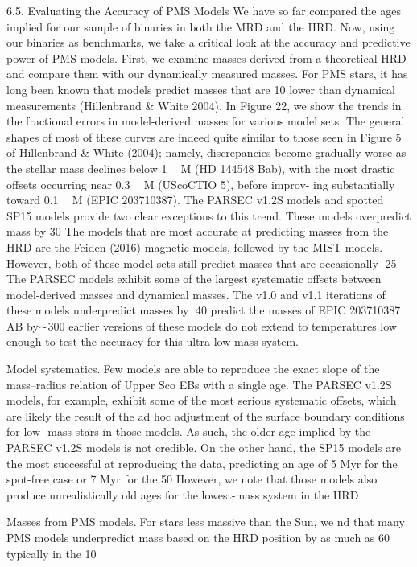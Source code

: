\documentclass[../Main.tex]{subfiles}
\begin{document}
{6.5. Evaluating the Accuracy of PMS Models
We have so far compared the ages implied for our sample of
binaries in both the MRD and the HRD. Now, using our
binaries as benchmarks, we take a critical look at the accuracy
and predictive power of PMS models. First, we examine
masses derived from a theoretical HRD and compare them with
our dynamically measured masses. For PMS stars, it has long
been known that models predict masses that are 10%
lower than dynamical measurements (Hillenbrand & White
2004). In Figure 22, we show the trends in the fractional errors
in model-derived masses for various model sets. The general
shapes of most of these curves are indeed quite similar to those
seen in Figure 5 of Hillenbrand & White (2004); namely,
discrepancies become gradually worse as the stellar mass
declines below 1  M (HD 144548 Bab), with the most drastic
offsets occurring near 0.3  M (UScoCTIO 5), before improv-
ing substantially toward 0.1  M (EPIC 203710387). The
PARSEC v1.2S models and spotted SP15 models provide
two clear exceptions to this trend. These models overpredict
mass by 30%
The models that are most accurate at predicting masses from
the HRD are the Feiden (2016) magnetic models, followed by
the MIST models. However, both of these model sets still
predict masses that are occasionally 25%
The PARSEC models exhibit some of the largest systematic
offsets between model-derived masses and dynamical masses. The v1.0 and v1.1 iterations of these models underpredict
masses by 40%
predict the masses of EPIC 203710387 AB by∼300%
earlier versions of these models do not extend to temperatures
low enough to test the accuracy for this ultra-low-mass system.

Model systematics.Few models are able to reproduce the
exact slope of the mass–radius relation of Upper Sco EBs
with a single age. The PARSEC v1.2S models, for
example, exhibit some of the most serious systematic
offsets, which are likely the result of the ad hoc
adjustment of the surface boundary conditions for low-
mass stars in those models. As such, the older age implied
by the PARSEC v1.2S models is not credible. On the
other hand, the SP15 models are the most successful at
reproducing the data, predicting an age of 5 Myr for the
spot-free case or 7 Myr for the 50%
However, we note that those models also produce
unrealistically old ages for the lowest-mass system in
the HRD

 Masses from PMS models.For stars less massive than the
Sun, we nd that many PMS models underpredict mass
based on the HRD position by as much as 60%
typically in the 10%


}
\end{document}
